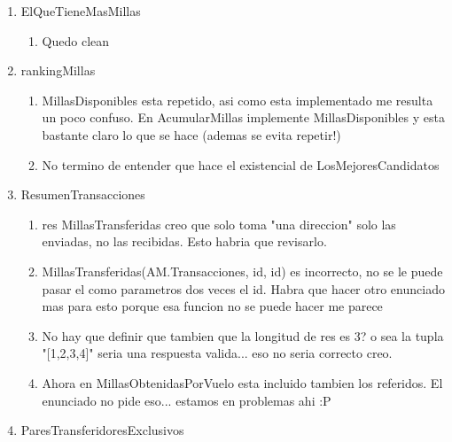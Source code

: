 \documentclass[11pt,a4paper]{article}
\begin{document}
\begin{enumerate}
\begin{enumerate}
	      \end{enumerate}
	\item ElQueTieneMasMillas
	      \begin{enumerate}
		      \item Quedo clean
	      \end{enumerate}
	\item rankingMillas
	      \begin{enumerate}
		      \item MillasDisponibles esta repetido, asi como esta implementado me resulta un poco confuso. En AcumularMillas implemente MillasDisponibles y esta bastante claro lo que se hace (ademas se evita repetir!)
		      \item No termino de entender que hace el existencial de LosMejoresCandidatos
	      \end{enumerate}
	\item ResumenTransacciones
	      \begin{enumerate}
		      \item res MillasTransferidas creo que solo toma "una direccion" solo las enviadas, no las recibidas. Esto habria que revisarlo.
		      \item MillasTransferidas(AM.Transacciones, id, id) es incorrecto, no se le puede pasar el como parametros dos veces el id. Habra que hacer otro enunciado mas para esto porque esa funcion no se puede hacer me parece
		      \item No hay que definir que tambien que la longitud de res es 3? o sea la tupla "[1,2,3,4]" seria una respuesta valida... eso no seria correcto creo.
		      \item Ahora en MillasObtenidasPorVuelo esta incluido tambien los referidos. El enunciado no pide eso... estamos en problemas ahi :P
	      \end{enumerate}
	\item ParesTransferidoresExclusivos

\end{enumerate}
\end{document}
